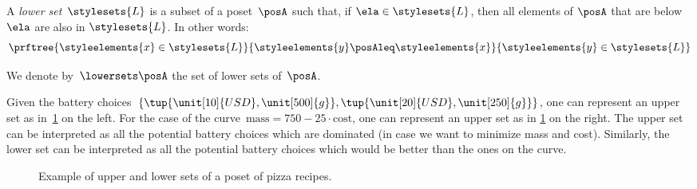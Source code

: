 \begin{definition}
  \label{def:lowerset}
  A \emph{lower set}~$\stylesets{L}$ is a subset of a poset~$\posA$ such that, if $\ela \in \stylesets{L}$, then all elements of $\posA$ that are below $\ela$ are also in $\stylesets{L}$.
  In other words:
  \begin{equation}
    \prftree{\styleelements{x}\in \stylesets{L}}{\styleelements{y}\posAleq \styleelements{x}}{\styleelements{y}\in \stylesets{L}}
  \end{equation}
\end{definition}
We denote by~$\lowersets \posA$ the set of lower sets of~$\posA$.
%

Given the battery choices~$\{\tup{\unit[10]{USD},\unit[500]{g}},\tup{\unit[20]{USD},\unit[250]{g}}\}$, one can represent an upper set as in~\cref{fig:upperset} on the left.
For the case of the curve~$\text{mass}=750-25\cdot \text{cost}$, one can represent an upper set as in \cref{fig:upperset} on the right.
The upper set can be interpreted as all the potential battery choices which are dominated (in case we want to minimize mass and cost).
Similarly, the lower set can be interpreted as all the potential battery choices which would be better than the ones on the curve.

\begin{figure}[h!]
  \begin{center}
  \end{center}
  \caption{Example of upper and lower sets of a poset of pizza recipes.}
  \label{fig:upperset}
\end{figure}

%
